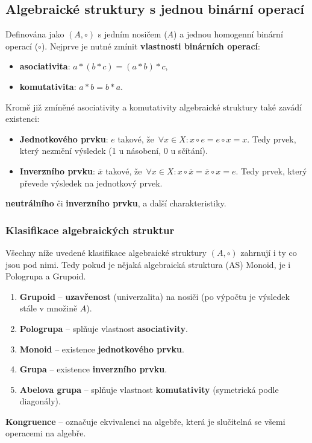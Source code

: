 \subsection{Algebraické struktury s jednou binární operací}
Definována jako $(A, \circ)$ s jedním nosičem ($ A $) a jednou homogenní binární operací ($ \circ $). Nejprve je nutné zmínit \textbf{vlastnosti binárních operací}: 
\begin{itemize}
\item \textbf{asociativita}: $a * (b * c) = (a * b) * c$,
\item \textbf{komutativita}: $a * b = b * a$.
\end{itemize}
Kromě již zmíněné asociativity a komutativity algebraické struktury také zavádí existenci:
\begin{itemize}
\item \textbf{Jednotkového prvku}: $e$ takové, že $\forall x \in X: x \circ e = e \circ x = x$. Tedy prvek, který nezmění výsledek (1 u násobení, 0 u sčítání).
\item \textbf{Inverzního prvku}: $\overline{x}$ takové, že $\forall x \in X: x \circ \overline{x} = \overline{x} \circ x = e$. Tedy prvek, který převede výsledek na jednotkový prvek.
\end{itemize}
\textbf{neutrálního} či \textbf{inverzního prvku}, a další charakteristiky.

\subsubsection{Klasifikace algebraických struktur}
Všechny níže uvedené klasifikace algebraické struktury $(A, \circ)$ zahrnují i ty co jsou pod nimi. Tedy pokud je nějaká algebraická struktura (AS) Monoid, je i Pologrupa a Grupoid.
\begin{enumerate}
\item \textbf{Grupoid} -- \textbf{uzavřenost} (univerzalita) na nosiči (po výpočtu je výsledek stále v množině $A$).
\item \textbf{Pologrupa} -- splňuje vlastnost \textbf{asociativity}.
\item \textbf{Monoid} -- existence \textbf{jednotkového prvku}.
\item \textbf{Grupa} -- existence \textbf{inverzního prvku}.
\item \textbf{Abelova grupa} -- splňuje vlastnost \textbf{komutativity} (symetrická podle diagonály).
\end{enumerate}

\noindent \textbf{Kongruence} -- označuje ekvivalenci na algebře, která je slučitelná se všemi operacemi na algebře.

